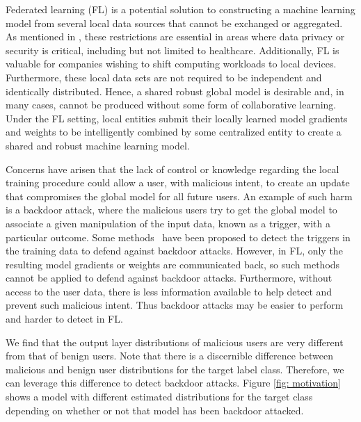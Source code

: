 \documentclass{article} %
\newcommand{\yli}[1]{{\color{cyan}#1}}
\begin{document}
Federated learning (FL) is a potential solution to constructing a machine learning model from several local data sources that cannot be exchanged or aggregated. As mentioned in \cite{fed-learn}, these restrictions are essential in areas where data privacy or security is critical, including but not limited to healthcare. 
Additionally, FL is valuable for companies wishing to shift computing workloads to local devices. Furthermore, these local data sets are not required to be independent and identically distributed. Hence, a shared robust global model is desirable and, in many cases, cannot be produced without some form of collaborative learning. 
Under the FL setting, local entities submit their locally learned model gradients and weights to be intelligently combined by some centralized entity to create a shared and robust machine learning model.


Concerns have arisen that the lack of control or knowledge regarding the local training procedure could allow a user, with malicious intent, to create an update that compromises the global model for all future users. An example of such harm is a backdoor attack, 
\yli{where the malicious users try to get the global model to associate a given manipulation of the input data, known as a trigger, with a particular outcome.}
\yli{Some methods~\citep{kurita2020weight,qi2020onion,li2021backdoor} have been proposed to detect the triggers in the training data to defend against backdoor attacks.}
However, in FL, only the resulting model gradients or weights are communicated back, 
\yli{so such methods cannot be applied to defend against backdoor attacks.}
Furthermore, without access to the user data, there is less information available to help detect and prevent such malicious intent. Thus backdoor attacks may be easier to perform and harder to detect in FL.

We find that the output layer distributions of malicious users are very different from that of benign users. Note that there is a discernible difference between malicious and benign user distributions for the target label class. Therefore, we can leverage this difference to detect backdoor attacks. Figure \ref{fig: motivation} shows a model with different estimated distributions for the target class depending on whether or not that model has been backdoor attacked. 
\end{document}
